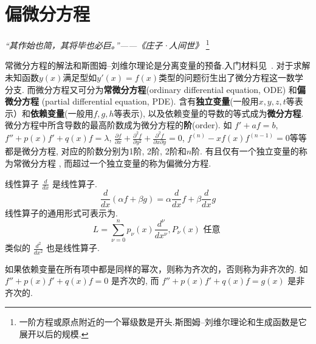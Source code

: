 \chapter{偏微分方程}

\begin{flushright}
\textit{“其作始也简，其将毕也必巨。”——《庄子·人间世》}
\footnote{一阶方程或原点附近的一个幂级数是开头.斯图姆--刘维尔理论和生成函数是它展开以后的规模.}
\end{flushright}

常微分方程的解法和斯图姆--刘维尔理论是分离变量的预备.入门材料见~\cite{boas}.
对于求解未知函数$y(x)$满足型如$y'(x) = f(x)$类型的问题衍生出了微分方程这一数学分支. 而微分方程又可分为\textbf{常微分方程}(ordinary differential equation, ODE)
和\textbf{偏微分方程} (partial differential equation, PDE).
含有\textbf{独立变量}(一般用$x,y,z, t$等表示）和\textbf{依赖变量}(一般用$f,g,h$等表示), 以及依赖变量的导数的等式成为\textbf{微分方程}.
微分方程中所含导数的最高阶数成为微分方程的\textbf{阶}(order).
如 $f' +  a f = b$, $f'' + p(x) f' + q(x) f = \lambda$, $\frac{\partial f}{\partial x} + \frac{\partial ^2f}{\partial y^2}  +\frac{\partial ^2f}{\partial x \partial y} = 0 $, 
$f^{(n)}  - x f(x) f^{(n-1)} = 0$等等都是微分方程, 对应的阶数分别为1阶, 2阶, 2阶和$n$阶. 有且仅有一个独立变量的称为常微分方程 , 而超过一个独立变量的称为偏微分方程.

线性算子
$\frac{d}{d x}$ 是线性算子.
$$
\frac{d}{d x}(\alpha f+\beta g)=\alpha \frac{d}{d x} f +\beta \frac{d}{d x} g
$$
线性算子的通用形式可表示为.
$$
L=\sum_{\nu=0}^n p_\nu(x) \frac{d^\nu}{d x^\nu}, P_\nu(x) \text { 任意 }
$$
类似的 $\frac{d^2}{d x^2}$ 也是线性算子.

如果依赖变量在所有项中都是同样的幂次，则称为齐次的，否则称为非齐次的.
如 $f'' + p(x) f' + q(x) f = 0$
是齐次的, 而 $f'' + p(x) f' + q(x) f = g(x)$ 是非齐次的.







